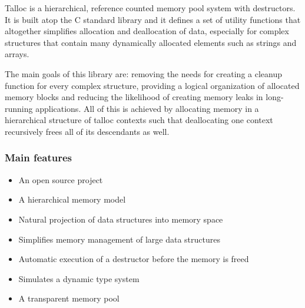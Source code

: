 Talloc is a hierarchical, reference counted memory pool system with destructors.
It is built atop the C standard library and it defines a set of utility
functions that altogether simplifies allocation and deallocation of data,
especially for complex structures that contain many dynamically allocated
elements such as strings and arrays.

The main goals of this library are: removing the needs for creating a cleanup
function for every complex structure, providing a logical organization of
allocated memory blocks and reducing the likelihood of creating memory leaks in
long-running applications. All of this is achieved by allocating memory in a
hierarchical structure of talloc contexts such that deallocating one context
recursively frees all of its descendants as well.

\subsubsection{Main features}
\begin{itemize}
  \item An open source project
  \item A hierarchical memory model
  \item Natural projection of data structures into memory space
  \item Simplifies memory management of large data structures
  \item Automatic execution of a destructor before the memory is freed
  \item Simulates a dynamic type system
  \item A transparent memory pool
\end{itemize}
